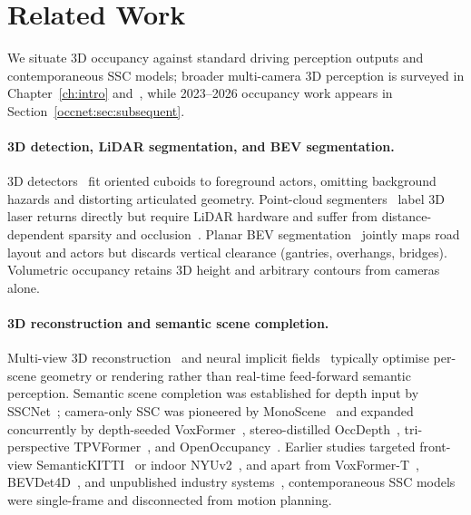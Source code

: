 \section{Related Work}\label{occnet:sec:related}

We situate 3D occupancy against standard driving perception outputs and contemporaneous SSC models; broader multi-camera 3D perception is surveyed in Chapter~\ref{ch:intro} and~\cite{li2023bevdevils}, while 2023--2026 occupancy work appears in Section~\ref{occnet:sec:subsequent}.

\paragraph{3D detection, LiDAR segmentation, and BEV segmentation.} 3D detectors~\cite{Shi2020PVRCNNPF,wang2021fcos3d,li2022bevformer,liu2023bevfusion} fit oriented cuboids to foreground actors, omitting background hazards and distorting articulated geometry. Point-cloud segmenters~\cite{zhu2021cylindrical,milioto2019rangenet++} label 3D laser returns directly but require LiDAR hardware and suffer from distance-dependent sparsity and occlusion~\cite{song2017sscnet}. Planar BEV segmentation~\cite{zhou2022cross,li2022hdmapnet} jointly maps road layout and actors but discards vertical clearance (gantries, overhangs, bridges). Volumetric occupancy retains 3D height and arbitrary contours from cameras alone.

\paragraph{3D reconstruction and semantic scene completion.} Multi-view 3D reconstruction~\cite{Hartley2004,mildenhall2020nerf} and neural implicit fields~\cite{mueller2022instant,cao2022scenerf,Tancik2022blocknerf,mescheder2019occupancy} typically optimise per-scene geometry or rendering rather than real-time feed-forward semantic perception. Semantic scene completion was established for depth input by SSCNet~\cite{song2017sscnet}; camera-only SSC was pioneered by MonoScene~\cite{cao2022monoscene} and expanded concurrently by depth-seeded VoxFormer~\cite{li2023voxformer}, stereo-distilled OccDepth~\cite{miao2023occdepth}, tri-perspective TPVFormer~\cite{huang2023tpvformer}, and OpenOccupancy~\cite{wang2023openoccupancy}. Earlier studies targeted front-view SemanticKITTI~\cite{behley2019semantickitti} or indoor NYUv2~\cite{Silberman2012nyuv2}, and apart from VoxFormer-T~\cite{li2023voxformer}, BEVDet4D~\cite{huang2022bevdet4d}, and unpublished industry systems~\cite{tesla_ai_day}, contemporaneous SSC models were single-frame and disconnected from motion planning.

